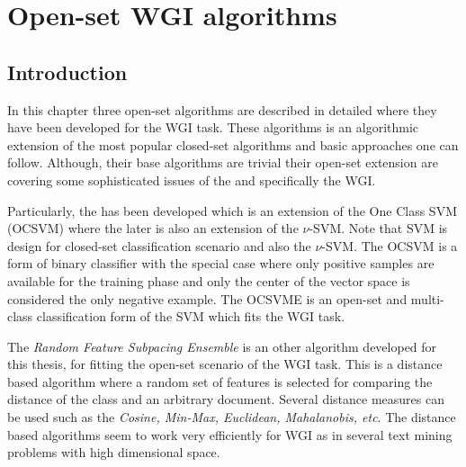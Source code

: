 
\chapter{Open-set WGI algorithms}

\label{chap:openset}


\newcommand{\keyword}[1]{\textbf{#1}}
\newcommand{\tabhead}[1]{\textbf{#1}}
\newcommand{\code}[1]{\texttt{#1}}
\newcommand{\file}[1]{\texttt{\bfseries#1}}
\newcommand{\option}[1]{\texttt{\itshape#1}}


\section{Introduction}\label{chap:openset:sec:intro}


In this chapter three open-set algorithms are described in detailed where they have been developed for the WGI task. These algorithms is an algorithmic extension of the most popular closed-set algorithms and basic approaches one can follow. Although, their base algorithms are trivial their open-set extension are covering some sophisticated issues of the  and specifically the WGI. 

Particularly, the  has been developed which is an extension of the One Class SVM (OCSVM) where the later is also an extension of the $\nu$-SVM. Note that SVM is design for closed-set classification scenario and also the $\nu$-SVM. The OCSVM is a form of binary classifier with the special case where only positive samples are available for the training phase and only the center of the vector space is considered the only negative example. The OCSVME is an open-set and multi-class classification form of the SVM which fits the WGI task. 

The \textit{Random Feature Subpacing Ensemble} is an other algorithm developed for this thesis, for fitting the open-set scenario of the WGI task. This is a distance based algorithm where a random set of features is selected for comparing the distance of the class and an arbitrary document. Several distance measures can be used such as the \textit{Cosine, Min-Max, Euclidean, Mahalanobis, etc}. The distance based algorithms seem to work very efficiently for WGI as in several text mining problems with high dimensional space.

